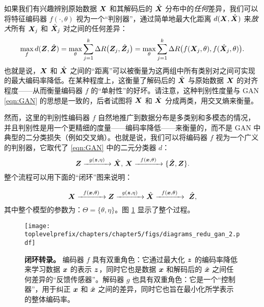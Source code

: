 \documentclass[../../book-main_zh.tex]{subfiles}
\begin{document}
{如果我们有兴趣辨别原始数据 $\bm{X}$ 和其解码后的 $\hat {\bm{X}}$ 分布中的{\em 任何}差异，我们可以将特征编码器 $f(\cdot, \theta)$ 视为一个“判别器”，通过简单地最大化距离 $d(\bm{X}, \hat {\bm{X}})$ 来{\em 放大}所有 $\bm{X}_j$ 和 $\hat {\bm{X}}_j$ 对之间的任何差异：
\begin{equation}
\max_f d(\bm{Z}, \hat {\bm{Z}}) = \max_{\theta} \sum_{j=1}^k \Delta R\big(\bm{Z}_j, \hat{\bm{Z}}_j\big) = \max_{\theta} \sum_{j=1}^k \Delta R\big(f(\bm{X}_j,\theta), f(\hat{\bm{X}}_j,\theta)\big).
    \label{eqn:max-distance}
\end{equation}
也就是说，$\bm{X}$ 和 $\hat {\bm{X}}$ 之间的“距离”可以被衡量为这两组中所有类别对之间可实现的最大编码率降低。在某种程度上，这衡量了解码后的 $\hat {\bm{X}}$ 与原始数据 $\bm{X}$ 的对齐程度——从而衡量编码器 $f$ 的“单射性”的好坏。请注意，这种判别性度量与 GAN \eqref{eqn:GAN} 的思想是一致的，后者试图将 $\bm{X}$ 和 $\hat {\bm{X}}$ 分成两类，用交叉熵来衡量。

然而，这里的判别性编码器 $f$ 自然地推广到数据分布是多类别和多模态的情况，并且判别性是用一个更精细的度量——编码率降低——来衡量的，而不是 GAN 中典型的二分类损失（例如交叉熵）。也就是说，我们可以将编码器 $f$ 视为一个广义的判别器，它取代了 \eqref{eqn:GAN} 中的二元分类器 $d$：
\begin{equation}
 \bm{Z} \xrightarrow{\hspace{2mm} g(\bm{z},\eta) \hspace{2mm}} \hat {\bm{X}}, \, \bm{X} \xrightarrow{\hspace{2mm} f(\bm{x}, \theta)\hspace{2mm}} \{\hat {\bm{Z}}, \bm{Z}\}.
 \label{eqn:closed-loop-GAN}
\end{equation}
整个流程可以用下面的“闭环”图来说明：}
\begin{equation}
    \bm{X} \xrightarrow{\hspace{2mm} f(\bm{x}, \theta)\hspace{2mm}} \bm{Z} \xrightarrow{\hspace{2mm} g(\bm{z},\eta) \hspace{2mm}} \hat {\bm{X}} \xrightarrow{\hspace{2mm} f(\bm{x}, \theta)\hspace{2mm}} \ \hat {\bm{Z}}, 
\end{equation}
其中整个模型的参数为：$\Theta = \{\theta, \eta\}$。图 \ref{fig:auto-encoding-closed} 显示了整个过程。

\begin{figure}[t]
{\texttt{[image: \\toplevelprefix/chapters/chapter5/figs/diagrams\_redu\_gan\_2.pdf]}}
\caption{{\bf 闭环转录。} 编码器 $f$ 具有双重角色：它通过最大化 $\bm{z}$ 的编码率降低来学习数据 $\bm{x}$ 的表示 $\bm{z}$，同时它也是数据 $\bm{x}$ 和解码后的 $\hat {\bm{x}}$ 之间任何差异的“反馈传感器”。解码器 $g$ 也具有双重角色：它是一个“控制器”，用于纠正 $\bm{x}$ 和 $\hat {\bm{x}}$ 之间的差异，同时它也旨在最小化所学表示的整体编码率。} \label{fig:auto-encoding-closed} 
\end{figure}
\end{document}
